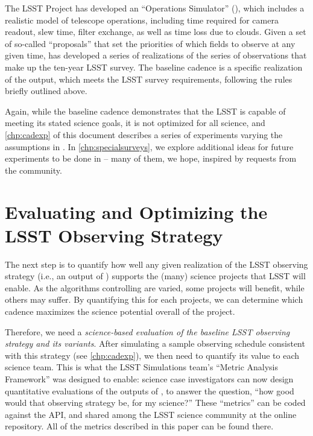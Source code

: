 The LSST Project has developed an ``Operations Simulator'' (\OpSim),
which
includes a realistic model of telescope operations, including time
required for camera readout, slew time, filter exchange, as well as time
loss due to clouds.  Given a set of so-called ``proposals''
that set the priorities of which fields to
observe at any given time, \OpSim has developed a series of realizations
of the series of observations that make up the ten-year LSST survey.
The baseline cadence is a specific realization of the
\OpSim output, which meets the LSST survey requirements, following the
rules briefly outlined above.

Again, while the baseline cadence demonstrates that the LSST is capable
of meeting its stated science goals, it is not optimized for all
science, and \autoref{chp:cadexp} of this document describes a
series of experiments varying the assumptions in \OpSim.  In
\autoref{chp:specialsurveys}, we explore additional ideas for future
experiments to be done in \OpSim -- many of them, we hope, inspired by
requests from the community.

\navigationbar


\section{Evaluating and Optimizing the LSST Observing Strategy}
\def\secname{intro:evaluation}\label{sec:\secname}

The next step is to quantify how well any given realization of the
LSST observing strategy (i.e., an output of \OpSim) supports the (many)
science projects that LSST will enable.  As the algorithms controlling
\OpSim are varied, some projects will benefit, while others may
suffer.  By quantifying this for each projects, we can determine which cadence
maximizes the science potential overall of the project.

Therefore, we need
a {\it science-based evaluation of the baseline
LSST observing strategy and its variants}. After simulating a sample
observing schedule consistent with this strategy (see
\autoref{chp:cadexp}), we then need to quantify its value to each
science team.  This is what the LSST Simulations team's ``Metric Analysis
Framework'' was designed to enable: science case investigators can
now design quantitative evaluations of the outputs of \OpSim, to answer
the question, ``how good would that observing strategy be, for my
science?'' These ``metrics'' can be coded against the \MAF API, and
shared among the LSST science community at the
\href{https://sims-maf.lsst.io/metricList.html#contributed-mafcontrib-metrics}{\simsMafContrib}
online repository. All of the \MAF metrics described in this paper can be
found there.

